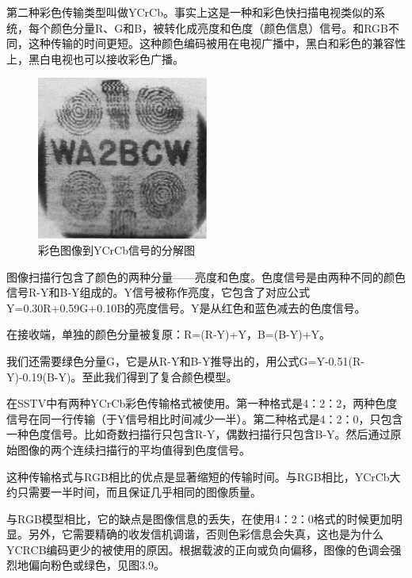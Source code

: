 第二种彩色传输类型叫做YCrCb。事实上这是一种和彩色快扫描电视类似的系统，每个颜色分量R、G和B，被转化成亮度和色度（颜色信息）信号。和RGB不同，这种传输的时间更短。这种颜色编码被用在电视广播中，黑白和彩色的兼容性上，黑白电视也可以接收彩色广播。

\begin{figure}
	\centering
	\includegraphics[width=0.7\linewidth]{figs/obrazek1.png}
	\caption{彩色图像到YCrCb信号的分解图}
\end{figure}

图像扫描行包含了颜色的两种分量——亮度和色度。色度信号是由两种不同的颜色信号R-Y和B-Y组成的。Y信号被称作亮度，它包含了对应公式Y=0.30R+0.59G+0.10B的亮度信号。Y是从红色和蓝色减去的色度信号。

在接收端，单独的颜色分量被复原：R=(R-Y)+Y，B=(B-Y)+Y。

我们还需要绿色分量G，它是从R-Y和B-Y推导出的，用公式G=Y-0.51(R-Y)-0.19(B-Y)。至此我们得到了复合颜色模型。

在SSTV中有两种YCrCb彩色传输格式被使用。第一种格式是4：2：2，两种色度信号在同一行传输（于Y信号相比时间减少一半）。第二种格式是4：2：0，只包含一种色度信号。比如奇数扫描行只包含R-Y，偶数扫描行只包含B-Y。然后通过原始图像的两个连续扫描行的平均值得到色度信号。

这种传输格式与RGB相比的优点是显著缩短的传输时间。与RGB相比，YCrCb大约只需要一半时间，而且保证几乎相同的图像质量。

与RGB模型相比，它的缺点是图像信息的丢失，在使用4：2：0格式的时候更加明显。另外，它需要精确的收发信机调谐，否则色彩信息会失真，这也是为什么YCRCB编码更少的被使用的原因。根据载波的正向或负向偏移，图像的色调会强烈地偏向粉色或绿色，见图3.9。

